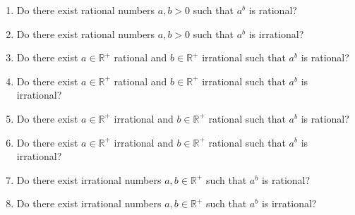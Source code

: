 \begin{enumerate}
 \item Do there exist rational numbers $a, b > 0$ such that $a^b$ is rational?
 \item Do there exist rational numbers $a, b > 0$ such that $a^b$ is irrational?
 \item Do there exist $a \in \mathbb{R}^{+}$ rational and $b \in \mathbb{R}^{+}$ irrational such that $a^b$ is rational?
 \item Do there exist $a \in \mathbb{R}^{+}$ rational and $b \in \mathbb{R}^{+}$ irrational such that $a^b$ is irrational?
 \item Do there exist $a \in \mathbb{R}^{+}$ irrational and $b \in \mathbb{R}^{+}$ rational such that $a^b$ is rational?
 \item Do there exist $a \in \mathbb{R}^{+}$ irrational and $b \in \mathbb{R}^{+}$ rational such that $a^b$ is irrational?
 \item Do there exist irrational numbers $a, b \in \mathbb{R}^{+}$ such that $a^b$ is rational?
 \item Do there exist irrational numbers $a, b \in \mathbb{R}^{+}$ such that $a^b$ is irrational?
\end{enumerate}

